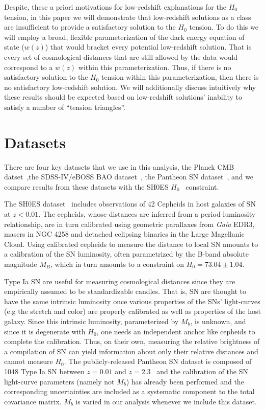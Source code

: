 \documentclass[
 reprint,
 amsmath,amssymb,
 aps,
]{revtex4-2}
\begin{document}
Despite, these a priori motivations for low-redshift explanations for the $H_0 $ tension, in this paper we will demonstrate that low-redshift solutions as a class are insufficient to provide a satisfactory solution to the $H_0$ tension. To do this we will employ a broad, flexible parameterization of the dark energy equation of state ($w(z)$) that would bracket every potential low-redshift solution.  That is every set of cosmological distances that are still allowed by the data would correspond to a $w(z)$ within this parameterization.  Thus, if there is no satisfactory solution to the $H_0$ tension within this parameterization, then there is no satisfactory low-redshift solution. We will additionally discuss intuitively why these results should be expected based on low-redshift solutions' inability to satisfy a number of ``tension triangles''.


\section{Datasets}
There are four key datasets that we use in this analysis, the Planck CMB datset~\cite{Planck:2018vyg},the SDSS-IV/eBOSS BAO dataset~\cite{eBOSS:2020yzd}, the Pantheon SN dataset~\cite{Pan-STARRS1:2017jku}, and we compare results from these datasets with the SH0ES $H_0$~\cite{Riess:2021jrx} constraint.

The SH0ES dataset~\cite{Riess:2021jrx} includes observations of 42 Cepheids in host galaxies of SN at $z<0.01$.  The cepheids, whose distances are inferred from a period-luminosity relationship, are in turn calibrated using geometric parallaxes from \textit{Gaia} EDR3, masers in NGC 4258 and detached eclipsing binaries in the Large Magellanic Cloud. Using calibrated cepheids to measure the distance to local SN amounts to a calibration of the SN luminosity, often parametrized by the B-band absolute magnitude $M_B$, which in turn amounts to a constraint on $H_0 = 73.04 \pm 1.04$.

Type Ia SN are useful for measuring cosmological distances since they are empirically assumed to be standardizable candles. That is, SN are thought to have the same intrinsic luminosity once various properties of the SNs' light-curves (e.g the stretch and color) are properly calibrated as well as properties of the host galaxy.
Since this intrinsic luminosity, parameterized by $M_b$, is unknown, and since it is degenerate with $H_0$, one needs an independent anchor like cepheids to complete the calibration.  Thus, on their own, measuring the relative brightness of a compilation of SN can yield information about only their relative distances and cannot measure $H_0$. The publicly-released Pantheon SN dataset is composed of 1048 Type Ia SN between $z = 0.01$ and $z=2.3$~\cite{Pan-STARRS1:2017jku} and the calibration of the SN light-curve parameters (namely not $M_b$) has already been performed and the corresponding uncertainties are included as a systematic component to the total covariance matrix. $M_b$ is varied in our analysis whenever we include this dataset.
\end{document}
